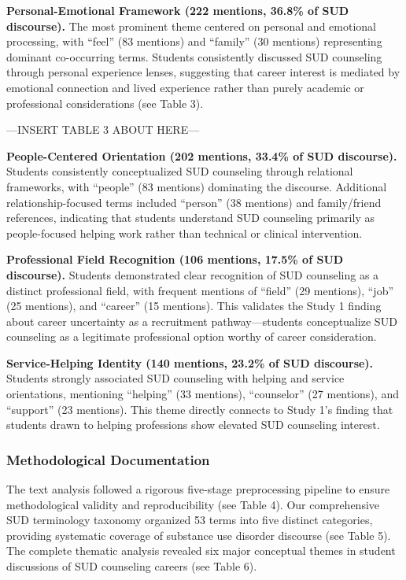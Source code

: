 \documentclass[
  man,
  longtable,
  nolmodern,
  notxfonts,
  notimes,
  colorlinks=true,linkcolor=blue,citecolor=blue,urlcolor=blue]{apa7}
\begin{document}
\textbf{Personal-Emotional Framework (222 mentions, 36.8\% of SUD
discourse).} The most prominent theme centered on personal and emotional
processing, with ``feel'' (83 mentions) and ``family'' (30 mentions)
representing dominant co-occurring terms. Students consistently
discussed SUD counseling through personal experience lenses, suggesting
that career interest is mediated by emotional connection and lived
experience rather than purely academic or professional considerations
(see Table 3).

---INSERT TABLE 3 ABOUT HERE---

\textbf{People-Centered Orientation (202 mentions, 33.4\% of SUD
discourse).} Students consistently conceptualized SUD counseling through
relational frameworks, with ``people'' (83 mentions) dominating the
discourse. Additional relationship-focused terms included ``person'' (38
mentions) and family/friend references, indicating that students
understand SUD counseling primarily as people-focused helping work
rather than technical or clinical intervention.

\textbf{Professional Field Recognition (106 mentions, 17.5\% of SUD
discourse).} Students demonstrated clear recognition of SUD counseling
as a distinct professional field, with frequent mentions of ``field''
(29 mentions), ``job'' (25 mentions), and ``career'' (15 mentions). This
validates the Study 1 finding about career uncertainty as a recruitment
pathway---students conceptualize SUD counseling as a legitimate
professional option worthy of career consideration.

\textbf{Service-Helping Identity (140 mentions, 23.2\% of SUD
discourse).} Students strongly associated SUD counseling with helping
and service orientations, mentioning ``helping'' (33 mentions),
``counselor'' (27 mentions), and ``support'' (23 mentions). This theme
directly connects to Study 1's finding that students drawn to helping
professions show elevated SUD counseling interest.

\subsubsection{Methodological
Documentation}\label{methodological-documentation}

The text analysis followed a rigorous five-stage preprocessing pipeline
to ensure methodological validity and reproducibility (see Table 4). Our
comprehensive SUD terminology taxonomy organized 53 terms into five
distinct categories, providing systematic coverage of substance use
disorder discourse (see Table 5). The complete thematic analysis
revealed six major conceptual themes in student discussions of SUD
counseling careers (see Table 6).
\end{document}

